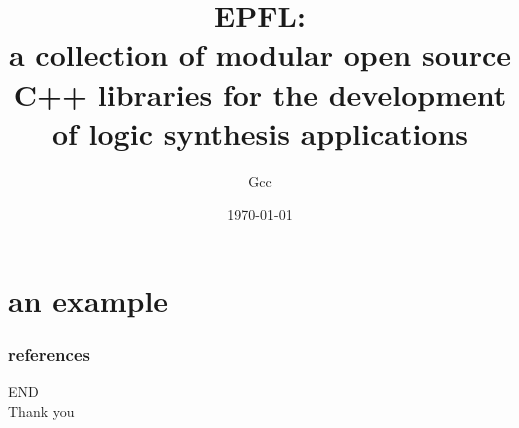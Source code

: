 \documentclass[aspectratio=1610]{beamer}
\title{EPFL: \\a collection of modular open source C++ libraries for the development of logic synthesis applications}
\author{Gcc}
\date\today
\begin{document}
\begin{frame}[plain]
  \titlepage
\end{frame}

\section{an example}
\begin{frame}[problem]
\end{frame}
\begin{frame}[problem]
\end{frame}
\begin{frame}[problem]
\end{frame}
\begin{frame}
	\frametitle{references}
	\printbibliography
\end{frame}
\begin{frame}
\Huge{END\\Thank you}
\end{frame}
\end{document}
